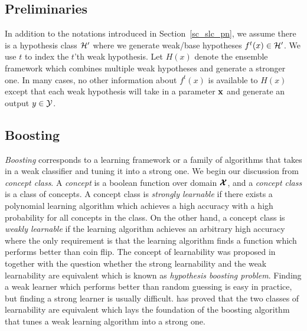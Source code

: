 {%
%
\subsection{Preliminaries} \label{sc_em_pn}

In addition to the notations introduced in Section~\ref{sc_slc_pn}, we assume there is a hypothesis class $\mathcal{H}'$ where we generate weak/base hypotheses $f^t(x)\in\mathcal{H}'$.
We use $t$ to index the $t$'th weak hypothesis.
Let $H(x)$ denote the ensemble framework which combines multiple weak hypotheses and generate a stronger one.
In many cases, no other information about $f^t(x)$ is available to $H(x)$ except that each weak hypothesis will take in a parameter $\mathbf {x}$ and generate an output $y\in\mathcal{Y}$.


\subsection{Boosting} \label{sc_boosting}

\textit{Boosting} corresponds to a learning framework or a family of algorithms that takes in a weak classifier and tuning it into a strong one.
We begin our discussion from \textit{concept class}.
A \textit{concept} is a boolean function over domain $\pmb {\mathcal{X}}$, and a \textit{concept class} is a class of concepts.
A concept class is \textit{strongly learnable} if there exists a polynomial learning algorithm which achieves a high accuracy with a high probability for all concepts in the class.
On the other hand, a concept class is \textit{weakly learnable} if the learning algorithm achieves an arbitrary high accuracy where the only requirement is that the learning algorithm finds a function which performs better than coin flip.
The concept of learnability was proposed in \citep{Kearns94cryptographic} together with the question whether the strong learnability and the weak learnability are equivalent which is known as \textit{hypothesis boosting problem}.
Finding a weak learner which performs better than random guessing is easy in practice, but finding a strong learner is usually difficult.
\citet{Schapire90the} has proved that the two classes of learnability are equivalent which lays the foundation of the boosting algorithm that tunes a weak learning algorithm into a strong one.

}
